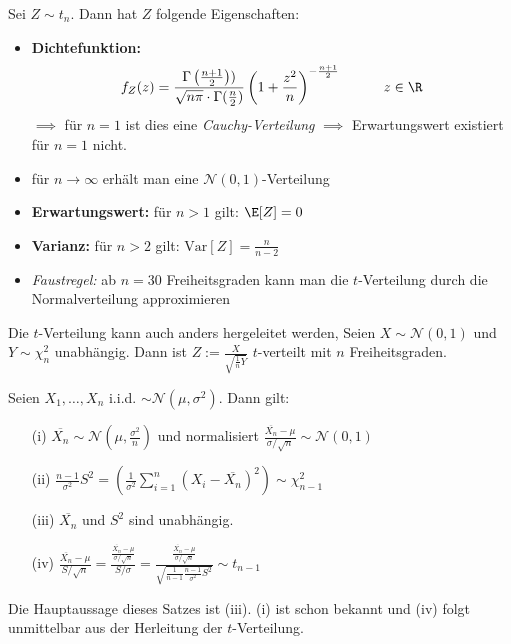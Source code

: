 Sei $Z \sim t_n$. Dann hat $Z$ folgende Eigenschaften:
\begin{itemize}
\item \textbf{Dichtefunktion:} $$f_Z(z) = \frac{\Gamma\left( \frac{n+1}{2}\right))}{\sqrt{n\pi} \cdot \Gamma(\frac{n}{2})} \left(1 + \frac{z^2}{n}\right)^{- \frac{n+1}{2}} \quad \quad \quad z \in \R$$
$\implies$ für $n=1$ ist dies eine \textit{Cauchy-Verteilung} $\implies$ Erwartungswert existiert für $n=1$ nicht.
\item für $n\to \infty$ erhält man eine $\mathcal{N}(0,1)$-Verteilung 
\item \textbf{Erwartungswert:} für $n>1$ gilt: $\E[Z] = 0$
\item \textbf{Varianz:} für $n>2$ gilt: $\mathrm{Var}[Z] = \frac{n}{n-2}$
\item \textit{Faustregel:} ab $n=30$ Freiheitsgraden kann man die $t$-Verteilung durch die Normalverteilung approximieren
\end{itemize}
Die $t$-Verteilung kann auch anders hergeleitet werden, Seien $X \sim \mathcal{N}(0,1)$ und $Y \sim \chi_n^2$ unabhängig. Dann ist $Z:= \frac{X}{\sqrt{\frac{1}{n} Y}}$ $t$-verteilt mit $n$ Freiheitsgraden.

\begin{satz}
Seien $X_1,\dots, X_n$ i.i.d. $\sim \mathcal{N}(\mu,\sigma^2)$. Dann gilt:
\begin{itemize}
\item[(i)] $\overline{X_n} \sim \mathcal{N}\left(\mu, \frac{\sigma^2}{n}\right)$ und normalisiert $\frac{\overline{X_n}-\mu}{\sigma / \sqrt{n}} \sim \mathcal{N}(0,1)$
\item[(ii)] $\frac{n-1}{\sigma^2}S^2 = \left(\frac{1}{\sigma^2} \sum_{i=1}^n (X_i - \overline{X_n})^2 \right) \sim \chi_{n-1}^2$
\item[(iii)] $\overline{X_n}$ und $S^2$ sind unabhängig.
\item[(iv)] $\frac{\overline{X_n}-\mu}{S / \sqrt{n}} = \frac{\frac{\overline{X_n}-\mu}{\sigma / \sqrt{n}}}{S/\sigma} = \frac{\frac{\overline{X_n}-\mu}{\sigma / \sqrt{n}}}{\sqrt{\frac{1}{n-1} \frac{n-1}{\sigma^2} S^2}} \sim t_{n-1}$
\end{itemize}
\end{satz}
Die Hauptaussage dieses Satzes ist (iii). (i) ist schon bekannt und (iv) folgt unmittelbar aus der Herleitung der $t$-Verteilung.


